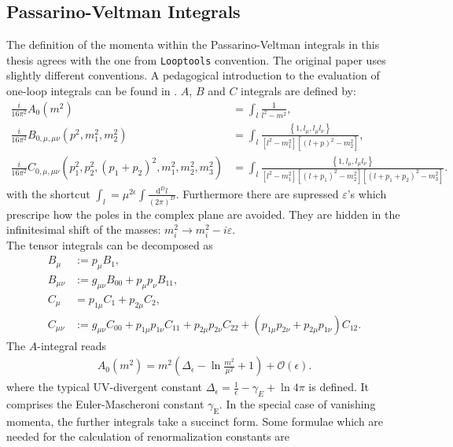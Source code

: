 \subsection{Passarino-Veltman Integrals}\label{sec:Passarino}
The definition of the momenta within the Passarino-Veltman integrals in this thesis agrees with the one from \texttt{Looptools} \cite{Hahn:1998} convention. The original paper \cite{Passarino:1978jh} uses slightly different conventions. A pedagogical introduction to the evaluation of one-loop integrals can be found in \cite{Ellis:2011cr}.  $A$, $B$ and $C$ integrals are defined by:
\begin{align}
\frac{i}{16\pi^2} A_0(m^2) &= \int_l \frac{1}{l^2-m^2},\nonumber\\
\frac{i}{16\pi^2} B_{0,\mu,\mu\nu}(p^2,m_1^2,m_2^2) &= \int_l \frac{\left\{1,l_\mu,l_\mu l_\nu \right\}}{[l^2-m_1^2][(l+p)^2-m_2^2]},\\
\frac{i}{16\pi^2} C_{0,\mu,\mu\nu}(p_1^2,p_2^2,(p_1+p_2)^2,m_1^2,m_2^2,m_3^2) &= \int_l \frac{\left\{1,l_\mu,l_\mu l_\nu \right\}}{[l^2-m_1^2][(l+p_1)^2-m_2^2][(l+p_1+p_2)^2-m_3^2]}.\nonumber\label{eq:LoopInt}
\end{align}
with the shortcut $\int_l = \mu^{2\epsilon}\int\frac{\mathrm{d}^D l}{(2\pi)^D}$. Furthermore there are supressed $\varepsilon$'s which prescripe how the poles in the complex plane are avoided. They are hidden in the infinitesimal shift of the masses: $m_i^2 \to m_i^2 - i \varepsilon$.\\
The tensor integrals can be decomposed as
\begin{align}
B_\mu &:= p_\mu B_1,\nonumber\\
B_{\mu\nu} &:= g_{\mu\nu}B_{00} + p_\mu p_\nu B_{11},\nonumber\\
C_\mu &= p_{1\mu}C_1 + p_{2\mu}C_2,\\
C_{\mu\nu} &:= g_{\mu\nu}C_{00} + p_{1\mu}p_{1\nu}C_{11} + p_{2\mu}p_{2\nu}C_{22} + (p_{1\mu}p_{2\nu} + p_{2\mu}p_{1\nu})C_{12}.\nonumber
\end{align}
The $A$-integral reads
\begin{align}
A_0(m^2) = m^2\left( \Delta_\epsilon -\ln \frac{m^2}{\mu^2} + 1 \right) + \mathcal{O}(\epsilon).
\end{align}
where the typical UV-divergent constant $\Delta_\epsilon = \frac{1}{\epsilon} - \gamma_E+\ln 4\pi$ is defined. It comprises the Euler-Mascheroni constant $\gamma_{\mathrm{E}}$. In the special case of vanishing momenta, the further integrals take a succinct form. Some formulae which are needed for the calculation of renormalization constants are
